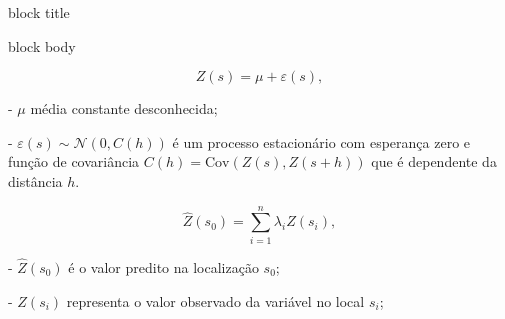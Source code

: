 \documentclass[final]{beamer}
\newlength{\colwidth}
\begin{document}
\begin{frame}[t]
\begin{columns}[t]
\begin{column}{\colwidth}
\begin{beamercolorbox}[wd=\colwidth, sep=6pt, leftskip=6pt, rightskip=6pt]{block title}
 \fontsize{18}{20}\selectfont {}
\end{beamercolorbox}
\begin{beamercolorbox}[wd=\colwidth, sep=2pt, leftskip=2pt, rightskip=2pt]{block body}
  \vspace{-2pt} %



                \begin{equation}\label{eqn1_normal}
                Z(s) = \mu + \varepsilon(s),
                \end{equation}

            \hspace{1 cm} - $\mu$ média constante desconhecida; 
               
           \hspace{1 cm} - \( \varepsilon(s) \sim \mathcal{N}(0, C(h)) \) é um processo estacionário com esperança zero e função de covariância 
            \( C(h) = \text{Cov}(Z(s), Z(s+h)) \)            
            que é  dependente da distância \( h \). 

             \vspace{0.5cm}
                \begin{equation}\label{eqn2_krig}
                \hat{Z}(s_0) = \sum_{i=1}^n \lambda_i Z(s_i),
                \end{equation}
                
          \hspace{1 cm}- $\hat{Z}(s_0)$ é o valor predito na localização $s_0$;

          \hspace{1 cm}- $Z(s_i)$ representa o valor observado da variável no local $s_i$;
        

\end{beamercolorbox}
\end{column}
\end{columns}
\end{frame}
\end{document}
